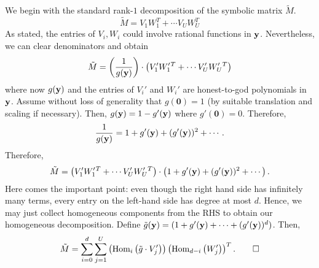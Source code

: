 We begin with the standard rank-$1$ decomposition of the symbolic matrix $\tilde{M}$.
\[
  \tilde{M} = V_1 W_1^T + \cdots V_U W_U^T
\]
As stated, the entries of $V_i,W_i$ could involve rational functions in $\mathbf{y}$. Nevertheless, we can clear denominators and obtain
\[
\tilde{M} = \left(\frac{1}{g(\mathbf{y})}\right) \cdot \left(V'_1 W'_1{}^T + \cdots V'_U W'_U{}^T\right)
\]
where now $g(\mathbf{y})$ and the entries of $V_i'$ and $W_i'$ are honest-to-god polynomials in $\mathbf{y}$. Assume without loss of generality that $g(\mathbf{0}) = 1$ (by suitable translation and scaling if necessary). Then, $g(\mathbf{y}) = 1 - g'(\mathbf{y})$ where $g'(\mathbf{0}) = 0$. Therefore,
\[
\frac{1}{g(\mathbf{y})} = 1 + g'(\mathbf{y}) + (g'(\mathbf{y}))^2 + \cdots . 
\]
Therefore, 
\[
  \tilde{M} = \left(V'_1 W'_1{}^T + \cdots V'_U W'_U{}^T\right) \cdot \left(1 + g'(\mathbf{y}) + (g'(\mathbf{y}))^2 + \cdots\right).
\]
Here comes the important point: even though the right hand side has infinitely many terms, every entry on the left-hand side has degree at most $d$. Hence, we may just collect homogeneous components from the RHS to obtain our homogeneous decomposition. Define $\tilde{g}(\mathbf{y}) = (1 + g'(\mathbf{y}) + \cdots + (g'(\mathbf{y}))^d)$. Then,
\[
  \tilde{M} = \sum_{i=0}^d \sum_{j=1}^U \left(\operatorname{Hom}_{ i}\left(\tilde{g} \cdot V_j'\right)\right) \left(\operatorname{Hom}_{d - i}\left(W_j'\right)\right)^T. \qed
\]


